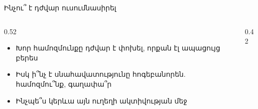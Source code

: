 \begin{frame}{Ինչու՞ է դժվար ուսումնասիրել}
  \begin{columns}[c]
    \begin{column}{0.52\textwidth}
      \begin{itemize}
        \item Խոր համոզմունքը դժվար է փոխել, որքան էլ ապացույց բերես
        \item<2-> Իսկ ի՞նչ է սնահավատությունը հոգեբանորեն. համոզմու՞նք, գաղափա՞ր
        \item<3-> Ինչպե՞ս կերևա այն ուղեղի ակտիվության մեջ
      \end{itemize}
    \end{column}
    \begin{column}{0.42\textwidth}
      \centering
    \end{column}
  \end{columns}
\end{frame}

